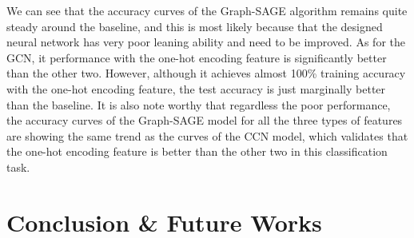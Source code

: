 \documentclass{article}
\begin{document}
We can see that the accuracy curves of the Graph-SAGE algorithm remains quite steady around the baseline, and this is most likely because that the designed neural network has very poor leaning ability and need to be improved. As for the GCN, it performance with the one-hot encoding feature is significantly better than the other two. However, although it achieves almost 100\% training accuracy with the one-hot encoding feature, the test accuracy is just marginally better than the baseline. It is also note worthy that regardless the poor performance, the accuracy curves of the Graph-SAGE model for all the three types of features are showing the same trend as the curves of the CCN model, which validates that the one-hot encoding feature is better than the other two in this classification task. 
\section{Conclusion \& Future Works}



\end{document}
